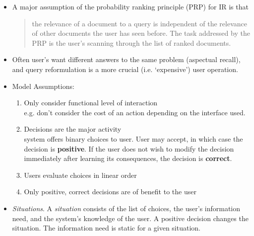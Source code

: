 \documentclass{article}
\begin{document}
\begin{itemize}

\item A major assumption of the probability ranking principle (PRP) for IR is that
    \begin{quote}
        the relevance of a document to a query is independent of the relevance of other documents the user has seen before.  The task addressed by the PRP is the user's scanning through the list of ranked documents.
    \end{quote}

\item Often user's want different answers to the same problem (aspectual recall), and query reformulation is a more crucial (i.e. `expensive') user operation.

\item Model Assumptions:
    \begin{enumerate}
        \item Only consider functional level of interaction \\
        {\footnotesize e.g. don't consider the cost of an action depending on the interface used.}
        \item Decisions are the major activity \\
        {\footnotesize system offers binary choices to user.  User may accept, in which case the decision is {\bf positive}.  If the user does not wish to modify the decision immediately after learning its consequences, the decision is {\bf correct}.}
        \item Users evaluate choices in linear order
        \item Only positive, correct decisions are of benefit to the user
    \end{enumerate}

\item {\it Situations}.  A {\it situation} consists of the list of choices, the user's information need, and the system's knowledge of the user.  A positive decision changes the situation.  The information need is static for a given situation.


\end{itemize}
\end{document}

